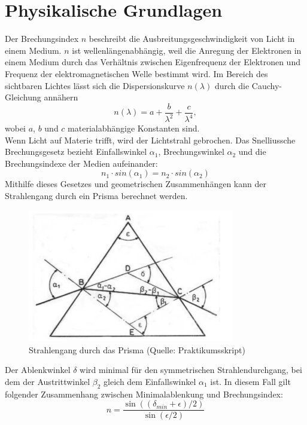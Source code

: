 \documentclass[12pt,a4paper]{article}
\begin{document}
\section{Physikalische Grundlagen}
Der Brechungsindex $n$ beschreibt die Ausbreitungsgeschwindigkeit von Licht in einem Medium. $n$ ist wellenlängenabhängig, weil die Anregung der Elektronen in einem Medium durch das Verhältnis zwischen Eigenfrequenz der Elektronen und Frequenz der elektromagnetischen Welle bestimmt wird. Im Bereich des sichtbaren Lichtes lässt sich die Dispersionskurve $n(\lambda)$ durch die Cauchy-Gleichung annähern
\begin{equation}\label{eq:Cauchy-Gleichung}
n(\lambda)=a+\frac{b}{\lambda^2}+\frac{c}{\lambda^4},
\end{equation}
wobei $a$, $b$ und $c$ materialabhängige Konstanten sind.\\
Wenn Licht auf Materie trifft, wird der Lichtstrahl gebrochen. Das Snelliussche Brechungsgesetz bezieht Einfallswinkel $\alpha_1$, Brechungswinkel $\alpha_2$ und die Brechungsindexe der Medien aufeinander:
\begin{equation}
n_1 \cdot sin(\alpha_1) = n_2 \cdot sin(\alpha_2)
\end{equation}
Mithilfe dieses Gesetzes und geometrischen Zusammenhängen kann der Strahlengang durch ein Prisma berechnet werden.
\begin{figure}[H]
	\centering
	\includegraphics[width=0.8\textwidth]{Prisma_Strahlengang.png}
	\caption{Strahlengang durch das Prisma (Quelle: Praktikumsskript)}
	\label{Prisma_Strahlengang}
\end{figure}
Der Ablenkwinkel $\delta$ wird minimal für den symmetrischen Strahlendurchgang, bei dem der Austrittwinkel $\beta_2$ gleich dem Einfallswinkel $\alpha_1$ ist. In diesem Fall gilt folgender Zusammenhang zwischen Minimalablenkung und Brechungsindex:
\begin{equation}\label{eq:n_aus_delmin}
n=\frac{\sin((\delta_{min}+\epsilon)/2)}{\sin(\epsilon/2)}
\end{equation}
\end{document}
